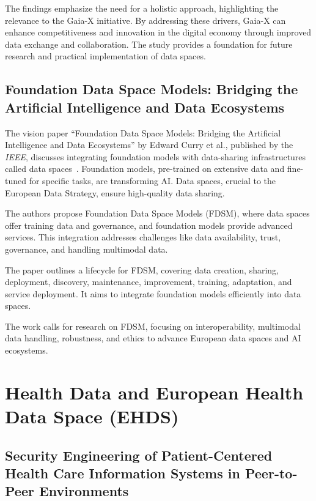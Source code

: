 The findings emphasize the need for a holistic approach, highlighting the relevance to the Gaia-X initiative.
By addressing these drivers, Gaia-X can enhance competitiveness and innovation in the digital economy through improved data exchange and collaboration.
The study provides a foundation for future research and practical implementation of data spaces.

\subsection{Foundation Data Space Models: Bridging the Artificial Intelligence and Data Ecosystems}\label{subsec:foundation-data-space-models:-bridging-the-artificial-intelligence-and-data-ecosystems}

The vision paper ``Foundation Data Space Models: Bridging the Artificial Intelligence and Data Ecosystems'' by Edward Curry et al., published by the \textit{IEEE}, discusses integrating foundation models with data-sharing infrastructures called data spaces~\cite{foundation_data_space_models}.
Foundation models, pre-trained on extensive data and fine-tuned for specific tasks, are transforming AI. Data spaces, crucial to the European Data Strategy, ensure high-quality data sharing.

The authors propose Foundation Data Space Models (FDSM), where data spaces offer training data and governance, and foundation models provide advanced services.
This integration addresses challenges like data availability, trust, governance, and handling multimodal data.

The paper outlines a lifecycle for FDSM, covering data creation, sharing, deployment, discovery, maintenance, improvement, training, adaptation, and service deployment.
It aims to integrate foundation models efficiently into data spaces.

The work calls for research on FDSM, focusing on interoperability, multimodal data handling, robustness, and ethics to advance European data spaces and AI ecosystems.

\section{Health Data and European Health Data Space (EHDS)}\label{sec:health-data-and-european-health-data-space}

\subsection{Security Engineering of Patient-Centered Health Care Information Systems in Peer-to-Peer Environments}\label{subsec:security-engineering-of-patient-centered-health-care-information-systems-in-peer-to-peer-environments}

